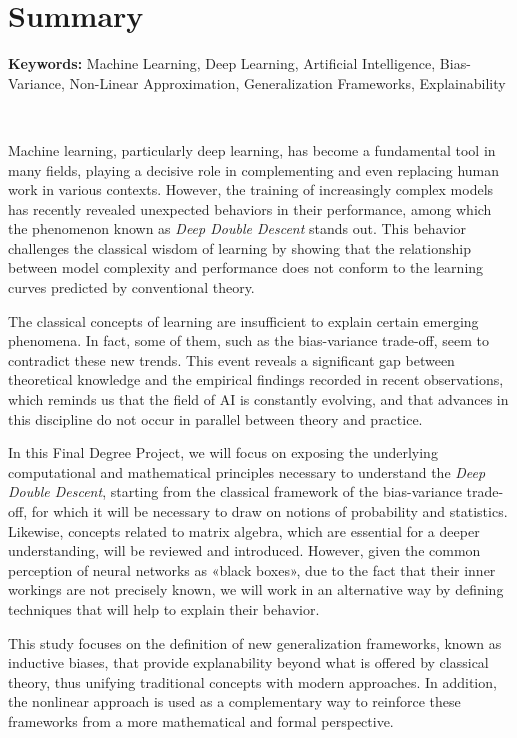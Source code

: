 %

\chapter{Summary}

\noindent\textbf{Keywords:} Machine Learning, Deep Learning, Artificial Intelligence, Bias-Variance, Non-Linear Approximation, Generalization Frameworks, Explainability

\

Machine learning, particularly deep learning, has become a fundamental tool in many fields, playing a decisive role in complementing and even replacing human work in various contexts. However, the training of increasingly complex models has recently revealed unexpected behaviors in their performance, among which the phenomenon known as \emph{Deep Double Descent} stands out. This behavior challenges the classical wisdom of learning by showing that the relationship between model complexity and performance does not conform to the learning curves predicted by conventional theory.

The classical concepts of learning are insufficient to explain certain emerging phenomena. In fact, some of them, such as the bias-variance trade-off, seem to contradict these new trends. This event reveals a significant gap between theoretical knowledge and the empirical findings recorded in recent observations, which reminds us that the field of AI is constantly evolving, and that advances in this discipline do not occur in parallel between theory and practice.

In this Final Degree Project, we will focus on exposing the underlying computational and mathematical principles necessary to understand the \emph{Deep Double Descent}, starting from the classical framework of the bias-variance trade-off, for which it will be necessary to draw on notions of probability and statistics. Likewise, concepts related to matrix algebra, which are essential for a deeper understanding, will be reviewed and introduced. However, given the common perception of neural networks as «black boxes», due to the fact that their inner workings are not precisely known, we will work in an alternative way by defining techniques that will help to explain their behavior.

This study focuses on the definition of new generalization frameworks, known as inductive biases, that provide explanability beyond what is offered by classical theory, thus unifying traditional concepts with modern approaches. In addition, the nonlinear approach is used as a complementary way to reinforce these frameworks from a more mathematical and formal perspective.

